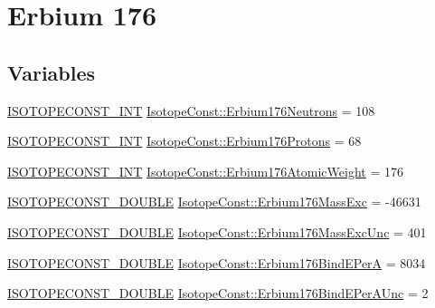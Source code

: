 \hypertarget{group___isotope_const-_erbium-_er176}{}\section{Erbium 176}
\label{group___isotope_const-_erbium-_er176}
\subsection*{Variables}
\begin{DoxyCompactItemize}
\item 
\mbox{\hyperlink{group___isotope_const-_macros_ga5f18360b3e99483a35c32d789e62621c}{I\+S\+O\+T\+O\+P\+E\+C\+O\+N\+S\+T\+\_\+\+I\+NT}} \mbox{\hyperlink{group___isotope_const-_erbium-_er176_ga3053d7d86d938b7e62745fbff5ecd4bb}{Isotope\+Const\+::\+Erbium176\+Neutrons}} = 108
\item 
\mbox{\hyperlink{group___isotope_const-_macros_ga5f18360b3e99483a35c32d789e62621c}{I\+S\+O\+T\+O\+P\+E\+C\+O\+N\+S\+T\+\_\+\+I\+NT}} \mbox{\hyperlink{group___isotope_const-_erbium-_er176_ga44242a6df54109b0e366ae3eed149ad6}{Isotope\+Const\+::\+Erbium176\+Protons}} = 68
\item 
\mbox{\hyperlink{group___isotope_const-_macros_ga5f18360b3e99483a35c32d789e62621c}{I\+S\+O\+T\+O\+P\+E\+C\+O\+N\+S\+T\+\_\+\+I\+NT}} \mbox{\hyperlink{group___isotope_const-_erbium-_er176_ga7775eb833d69447cbf0496e5a375eaee}{Isotope\+Const\+::\+Erbium176\+Atomic\+Weight}} = 176
\item 
\mbox{\hyperlink{group___isotope_const-_macros_ga8f45a7272ce02c0b4c65c44636ed719a}{I\+S\+O\+T\+O\+P\+E\+C\+O\+N\+S\+T\+\_\+\+D\+O\+U\+B\+LE}} \mbox{\hyperlink{group___isotope_const-_erbium-_er176_ga6c698635efff420b68c8bf02c81626c7}{Isotope\+Const\+::\+Erbium176\+Mass\+Exc}} = -\/46631
\item 
\mbox{\hyperlink{group___isotope_const-_macros_ga8f45a7272ce02c0b4c65c44636ed719a}{I\+S\+O\+T\+O\+P\+E\+C\+O\+N\+S\+T\+\_\+\+D\+O\+U\+B\+LE}} \mbox{\hyperlink{group___isotope_const-_erbium-_er176_gaddfaf233016a377c319145491fecde59}{Isotope\+Const\+::\+Erbium176\+Mass\+Exc\+Unc}} = 401
\item 
\mbox{\hyperlink{group___isotope_const-_macros_ga8f45a7272ce02c0b4c65c44636ed719a}{I\+S\+O\+T\+O\+P\+E\+C\+O\+N\+S\+T\+\_\+\+D\+O\+U\+B\+LE}} \mbox{\hyperlink{group___isotope_const-_erbium-_er176_ga0be16548b4545a28134006268dac8d01}{Isotope\+Const\+::\+Erbium176\+Bind\+E\+PerA}} = 8034
\item 
\mbox{\hyperlink{group___isotope_const-_macros_ga8f45a7272ce02c0b4c65c44636ed719a}{I\+S\+O\+T\+O\+P\+E\+C\+O\+N\+S\+T\+\_\+\+D\+O\+U\+B\+LE}} \mbox{\hyperlink{group___isotope_const-_erbium-_er176_ga2dfbe9cff49b83b13cb7835e61c4e266}{Isotope\+Const\+::\+Erbium176\+Bind\+E\+Per\+A\+Unc}} = 2

\end{DoxyCompactItemize}
